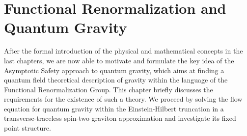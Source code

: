 \chapter{Functional Renormalization and Quantum Gravity}\label{chap:EHT}
After the formal introduction of the physical and mathematical concepts in the last chapters, we are now able to motivate and formulate the key idea of the Asymptotic Safety approach to quantum gravity, which aims at finding a quantum field theoretical description of gravity within the language of the Functional Renormalization Group. This chapter briefly discusses the requirements for the existence of such a theory. We proceed by solving the flow equation for quantum gravity within the Einstein-Hilbert truncation in a transverse-traceless spin-two graviton approximation and investigate its fixed point structure. 
\vspace{-0.6cm}
